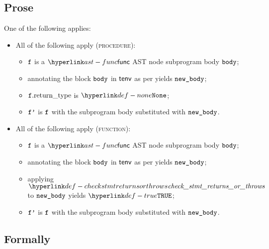 \subsection{Prose}
One of the following applies:
\begin{itemize}
  \item All of the following apply (\textsc{procedure}):
  \begin{itemize}
    \item $\vf$ is a $\func$ AST node subprogram body $\body$;
    \item annotating the block $\body$ in $\tenv$ as per  yields $\newbody$\ProseOrTypeError;
    \item $\vf.\funcreturntype$ is $\None$;
    \item $\vfp$ is $\vf$ with the subprogram body substituted with $\newbody$.
  \end{itemize}

  \item All of the following apply (\textsc{function}):
  \begin{itemize}
    \item $\vf$ is a $\func$ AST node subprogram body $\body$;
    \item annotating the block $\body$ in $\tenv$ as per  yields $\newbody$\ProseOrTypeError;
    \item applying $\checkstmtreturnsorthrows$ to $\newbody$ yields $\True$\ProseOrTypeError;
    \item $\vfp$ is $\vf$ with the subprogram body substituted with $\newbody$.
  \end{itemize}
\end{itemize}

\subsection{Formally}
\begin{mathpar}
\end{mathpar}

\begin{mathpar}
\end{mathpar}


